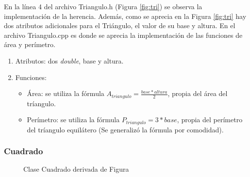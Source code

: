 \documentclass[11pt]{article}
\begin{document}
\newpage
En la línea 4 del archivo Triangulo.h (Figura \ref{fig:tri}) se observa la implementación de la herencia. Además, como se aprecia en la Figura \ref{fig:tri} hay dos atributos adicionales para el Triángulo, el valor de su base y altura.
En el archivo Triangulo.cpp es donde se aprecia la implementación de las funciones de área y perímetro.

\begin{enumerate}
 \item Atributos: dos \textit{double}, base y altura.
 \item Funciones:
	\begin{itemize}
    \item Área: se utiliza la fórmula $A_{triangulo}=\frac{base*altura}{2}$, propia del área del tríangulo.
    \item Perímetro: se utiliza la fórmula $P_{triangulo}=3*base$, propia del perímetro del tríangulo equilátero (Se generalizó la fórmula por comodidad).
    \end{itemize}
\end{enumerate}

\subsubsection{Cuadrado}

\begin{figure}[H]
\centering
{}
\caption{Clase Cuadrado derivada de Figura}
\label{fig:cua}
\end{figure}
\end{document}
